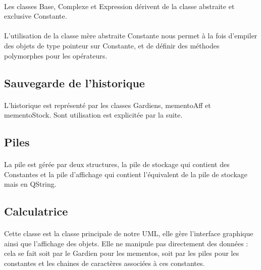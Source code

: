 \documentclass[a4paper,11pt]{report}
\begin{document}
			\paragraph{}Les classes Base, Complexe et Expression dérivent de la classe abstraite et exclusive Constante. 

			\paragraph{}L'utilisation de la classe mère abstraite Constante nous permet à la fois d'empiler des objets de type pointeur sur Constante, et de définir des méthodes polymorphes pour les opérateurs. 

		\subsection{Sauvegarde de l'historique}
	 		\paragraph{}L'historique est représenté par les classes Gardiens, mementoAff et mementoStock. Sont utilisation est explicitée par la suite.
		\subsection{Piles}
			\paragraph{} La pile est gérée par deux structures, la pile de stockage qui contient des Constantes et la pile d'affichage qui contient l'équivalent de la pile de stockage mais en QString.
		
		\subsection{Calculatrice}
			\paragraph{}Cette classe est la classe principale de notre UML, elle gère l'interface graphique ainsi que l'affichage des objets. Elle ne manipule pas directement des données : cela se fait soit par le Gardien pour les mementos, soit par les piles pour les constantes et les chaines de caractères associées à ces constantes.
			
\end{document}
